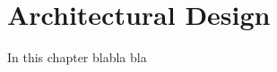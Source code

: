 \documentclass[../dd]{subfiles}
\begin{document}
\chapter{Architectural Design}
\label{architectural_design}

\setmyfancystyle

In this chapter blabla bla
\end{document}
